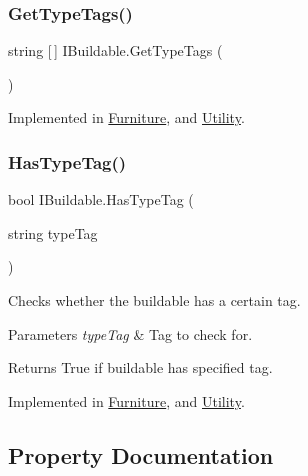 \subsubsection{\texorpdfstring{Get\+Type\+Tags()}{GetTypeTags()}}
{\footnotesize\ttfamily string \mbox{[}$\,$\mbox{]} I\+Buildable.\+Get\+Type\+Tags (\begin{DoxyParamCaption}{ }\end{DoxyParamCaption})}



Implemented in \hyperlink{class_furniture_aca7ba6acd54e3969018a2f8848dc2632}{Furniture}, and \hyperlink{class_utility_afd1291684c20135877fc55e4bb261199}{Utility}.

\mbox{\label{interface_i_buildable_a4569a897fc2ac7c0ecfaddc518fa346f}} 
\subsubsection{\texorpdfstring{Has\+Type\+Tag()}{HasTypeTag()}}
{\footnotesize\ttfamily bool I\+Buildable.\+Has\+Type\+Tag (\begin{DoxyParamCaption}\item[{string}]{type\+Tag }\end{DoxyParamCaption})}



Checks whether the buildable has a certain tag. 


\begin{DoxyParams}{Parameters}
{\em type\+Tag} & Tag to check for.\\
\hline
\end{DoxyParams}
\begin{DoxyReturn}{Returns}
True if buildable has specified tag.
\end{DoxyReturn}


Implemented in \hyperlink{class_furniture_ac7197b3778cafab778581d936d2b5983}{Furniture}, and \hyperlink{class_utility_ac16027b44fefca96cea2491461a7d36c}{Utility}.



\subsection{Property Documentation}
\mbox{\label{interface_i_buildable_ab50da031a30c904d22053badaf1b2fdd}} 
